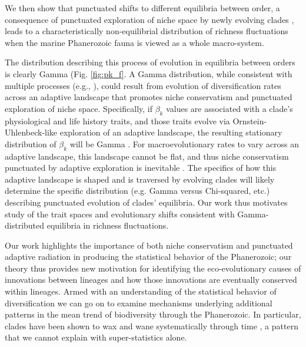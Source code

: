 \documentclass[12pt]{article}
\let\citep=\cite
\begin{document}
We then show that punctuated shifts to different equilibria between
order, a consequence of punctuated exploration of niche space by newly
evolving clades \citep{eldredgeGould1972, newman1985adaptive,
  hopkins2014}, leads to a characteristically non-equilibrial
distribution of richness fluctuations when the marine Phanerozoic
fauna is viewed as a whole macro-system.

The distribution describing this process of evolution in equilibria
between orders is clearly Gamma (Fig. \ref{fig:pk_f}.  A Gamma
distribution, while consistent with multiple processes (e.g.,
\citep{cir1985}), could result from evolution of diversification rates
across an adaptive landscape that promotes niche conservatism and
punctuated exploration of niche space.  Specifically, if $\beta_k$
values are associated with a clade's physiological and life history
traits, and those traits evolve via Ornstein-Uhlenbeck-like
exploration of an adaptive landscape, the resulting stationary
distribution of $\beta_k$ will be Gamma \citep{cir1985, butler2004}.
For macroevolutionary rates to vary across an adaptive landscape, this
landscape cannot be flat, and thus niche conservatism punctuated by
adaptive exploration is inevitable \citep{newman1985adaptive}. The
specifics of how this adaptive landscape is shaped and is traversed by
evolving clades will likely determine the specific distribution
(e.g. Gamma versus Chi-squared, etc.) describing punctuated evolution
of clades' equilibria.  Our work thus motivates study of the trait
spaces and evolutionary shifts consistent with Gamma-distributed
equilibria in richness fluctuations.

Our work highlights the importance of both niche conservatism and
punctuated adaptive radiation in producing the statistical behavior of
the Phanerozoic; our theory thus provides new motivation for
identifying the eco-evolutionary causes of innovations between
lineages and how those innovations are eventually conserved within
lineages. Armed with an understanding of the statistical behavior of
diversification we can go on to examine mechanisms underlying
additional patterns in the mean trend of biodiversity through the
Phanerozoic. In particular, clades have been shown to wax and wane
systematically through time \citep{liow2007,
  quental2013}, a pattern that we cannot explain with super-statistics
alone.
\end{document}

